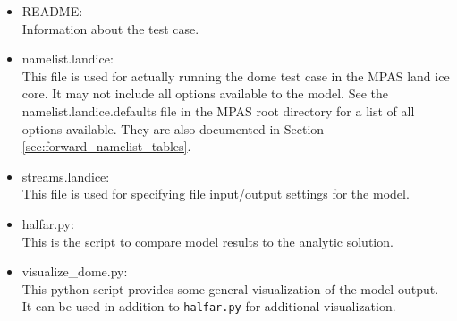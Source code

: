 \begin{itemize}
	\item README: \\
		Information about the test case.

	\item namelist.landice: \\
		This file is used for actually running the dome test case in the MPAS land ice core.  It may not include all options available to the model.  See the namelist.landice.defaults file in the MPAS root directory for a list of all options available.  They are also documented in Section \ref{sec:forward_namelist_tables}.

	\item streams.landice: \\
		This file is used for specifying file input/output settings for the model.

	\item halfar.py: \\
		This is the script to compare model results to the analytic solution.

	\item visualize\_dome.py: \\
		This python script provides some general visualization of the model output.
		It can be used in addition to \texttt{halfar.py} for additional visualization.




\end{itemize}
